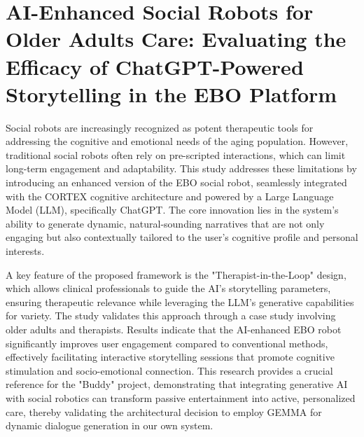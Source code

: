 \section[AI-Enhanced Social Robots for Older Adults Care: Evaluating the Efficacy of ChatGPT-Powered Storytelling in the EBO Platform]{AI-Enhanced Social Robots for Older Adults Care: Evaluating the Efficacy of ChatGPT-Powered Storytelling in the EBO Platform \cite{paper_7}}
\hspace*{17pt} Social robots are increasingly recognized as potent therapeutic tools for addressing the cognitive and emotional needs of the aging population. However, traditional social robots often rely on pre-scripted interactions, which can limit long-term engagement and adaptability. This study addresses these limitations by introducing an enhanced version of the EBO social robot, seamlessly integrated with the CORTEX cognitive architecture and powered by a Large Language Model (LLM), specifically ChatGPT. The core innovation lies in the system's ability to generate dynamic, natural-sounding narratives that are not only engaging but also contextually tailored to the user's cognitive profile and personal interests.

A key feature of the proposed framework is the "Therapist-in-the-Loop" design, which allows clinical professionals to guide the AI's storytelling parameters, ensuring therapeutic relevance while leveraging the LLM's generative capabilities for variety. The study validates this approach through a case study involving older adults and therapists. Results indicate that the AI-enhanced EBO robot significantly improves user engagement compared to conventional methods, effectively facilitating interactive storytelling sessions that promote cognitive stimulation and socio-emotional connection. This research provides a crucial reference for the "Buddy" project, demonstrating that integrating generative AI with social robotics can transform passive entertainment into active, personalized care, thereby validating the architectural decision to employ GEMMA for dynamic dialogue generation in our own system.

\newpage

